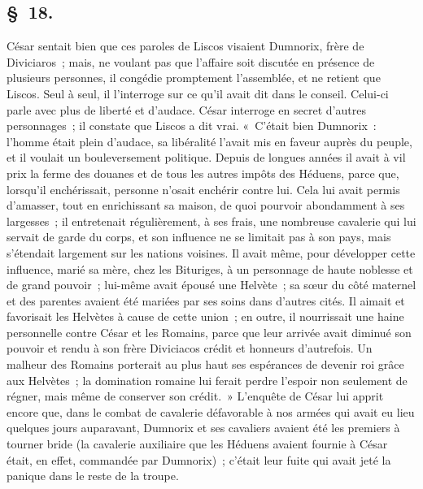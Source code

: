 \documentclass[french,twoside]{book} %
\begin{document}
\subsection[{§ 18.}]{ \textsc{§ 18.} }
\noindent César sentait bien que ces paroles de Liscos visaient Dumnorix, frère de Diviciaros ; mais, ne voulant pas que l’affaire soit discutée en présence de plusieurs personnes, il congédie promptement l’assemblée, et ne retient que Liscos. Seul à seul, il l’interroge sur ce qu’il avait dit dans le conseil. Celui-ci parle avec plus de liberté et d’audace. César interroge en secret d’autres personnages ; il constate que Liscos a dit vrai. « C'était bien Dumnorix : l’homme était plein d’audace, sa libéralité l’avait mis en faveur auprès du peuple, et il voulait un bouleversement politique. Depuis de longues années il avait à vil prix la ferme des douanes et de tous les autres impôts des Héduens, parce que, lorsqu’il enchérissait, personne n’osait enchérir contre lui. Cela lui avait permis d’amasser, tout en enrichissant sa maison, de quoi pourvoir abondamment à ses largesses ; il entretenait régulièrement, à ses frais, une nombreuse cavalerie qui lui servait de garde du corps, et son influence ne se limitait pas à son pays, mais s’étendait largement sur les nations voisines. Il avait même, pour développer cette influence, marié sa mère, chez les Bituriges, à un personnage de haute noblesse et de grand pouvoir ; lui-même avait épousé une Helvète ; sa sœur du côté maternel et des parentes avaient été mariées par ses soins dans d’autres cités. Il aimait et favorisait les Helvètes à cause de cette union ; en outre, il nourrissait une haine personnelle contre César et les Romains, parce que leur arrivée avait diminué son pouvoir et rendu à son frère Diviciacos crédit et honneurs d’autrefois. Un malheur des Romains porterait au plus haut ses espérances de devenir roi grâce aux Helvètes ; la domination romaine lui ferait perdre l’espoir non seulement de régner, mais même de conserver son crédit. » L'enquête de César lui apprit encore que, dans le combat de cavalerie défavorable à nos armées qui avait eu lieu quelques jours auparavant, Dumnorix et ses cavaliers avaient été les premiers à tourner bride (la cavalerie auxiliaire que les Héduens avaient fournie à César était, en effet, commandée par Dumnorix) ; c’était leur fuite qui avait jeté la panique dans le reste de la troupe.
\end{document}
